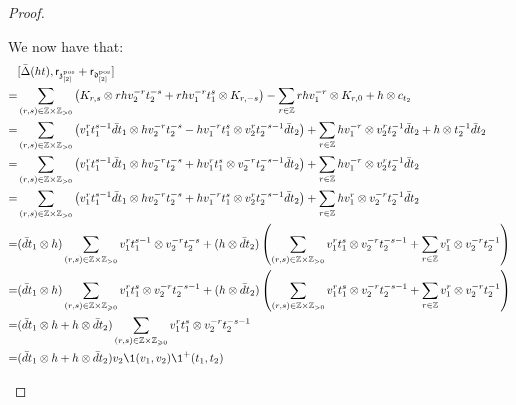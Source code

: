 \begin{proof}
\begin{enumerate}
                    We now have that:
                        $$
                            \begin{aligned}
                                & [\bar{\Delta}(ht), \sfr_{\z_{[2]}^{\positive}} + \sfr_{\d_{[2]}^{\positive}}]
                                \\
                                = & \sum_{(r, s) \in \Z \x \Z_{> 0}} \left( K_{r, s} \tensor r h v_2^{-r} t_2^{-s} + r h v_1^{-r} t_1^s \tensor K_{r, -s} \right) - \sum_{r \in \Z} r h v_1^{-r} \tensor K_{r, 0} + h \tensor c_{t_2}
                                \\
                                = & \sum_{(r, s) \in \Z \x \Z_{> 0}} \left( v_1^r t_1^{s - 1} \bar{d}t_1 \tensor h v_2^{-r} t_2^{-s} - h v_1^{-r} t_1^s \tensor v_2^r t_2^{-s - 1} \bar{d}t_2 \right) + \sum_{r \in \Z} h v_1^{-r} \tensor v_2^r t_2^{-1} \bar{d}t_2 + h \tensor t_2^{-1} \bar{d}t_2
                                \\
                                = & \sum_{(r, s) \in \Z \x \Z_{> 0}} \left( v_1^r t_1^{s - 1} \bar{d}t_1 \tensor h v_2^{-r} t_2^{-s} + h v_1^r t_1^s \tensor v_2^{-r} t_2^{-s - 1} \bar{d}t_2 \right) + \sum_{r \in \Z} h v_1^{-r} \tensor v_2^r t_2^{-1} \bar{d}t_2
                                \\
                                = & \sum_{(r, s) \in \Z \x \Z_{> 0}} \left( v_1^r t_1^{s - 1} \bar{d}t_1 \tensor h v_2^{-r} t_2^{-s} + h v_1^{-r} t_1^s \tensor v_2^r t_2^{-s - 1} \bar{d}t_2 \right) + \sum_{r \in \Z} h v_1^r \tensor v_2^{-r} t_2^{-1} \bar{d}t_2
                                \\
                                = & ( \bar{d}t_1 \tensor h ) \sum_{(r, s) \in \Z \x \Z_{> 0}} v_1^r t_1^{s - 1} \tensor v_2^{-r} t_2^{-s} + ( h \tensor \bar{d}t_2 ) \left( \sum_{(r, s) \in \Z \x \Z_{> 0}} v_1^r t_1^s \tensor v_2^{-r} t_2^{-s - 1} + \sum_{r \in \Z} v_1^r \tensor v_2^{-r} t_2^{-1} \right)
                                \\
                                = & ( \bar{d}t_1 \tensor h ) \sum_{(r, s) \in \Z \x \Z_{\geq 0}} v_1^r t_1^s \tensor v_2^{-r} t_2^{-s - 1} + ( h \tensor \bar{d}t_2 ) \left( \sum_{(r, s) \in \Z \x \Z_{> 0}} v_1^r t_1^s \tensor v_2^{-r} t_2^{-s - 1} + \sum_{r \in \Z} v_1^r \tensor v_2^{-r} t_2^{-1} \right)
                                \\
                                = & ( \bar{d}t_1 \tensor h + h \tensor \bar{d}t_2 ) \sum_{(r, s) \in \Z \x \Z_{\geq 0}} v_1^r t_1^s \tensor v_2^{-r} t_2^{-s - 1}
                                \\
                                = & ( \bar{d}t_1 \tensor h + h \tensor \bar{d}t_2 ) v_2 \1(v_1, v_2) \1^+(t_1, t_2)
                            \end{aligned}
                        $$


\end{enumerate}
\end{proof}
